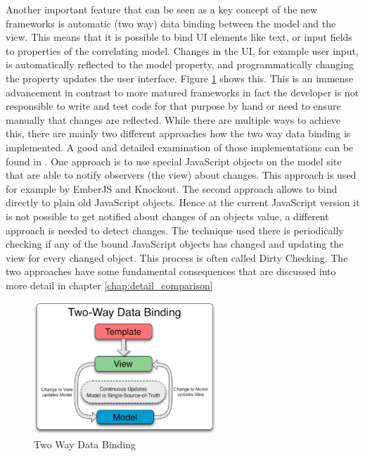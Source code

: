 Another important feature that can be seen as a key concept of the new frameworks is automatic (two way) data binding between the model and the view.
This means that it is possible to bind UI elements like text, or input fields to properties of the correlating model.
Changes in the UI, for example user input, is automatically reflected to the model property, and programmatically changing the property updates the user interface. Figure \ref{fig:data-binding} shows this.
This is an immense advancement in contrast to more matured frameworks in fact the developer is not responsible to write and test code for that purpose by hand or need to ensure manually that changes are reflected.
While there are multiple ways to achieve this, there are mainly two different approaches how the two way data binding is implemented.
A good and detailed examination of those implementations can be found in \autocite[]{binding_comparison}.
One approach is to use special JavaScript objects on the model site that are able to notify observers (the view) about changes.
This approach is used for example by EmberJS and Knockout.
The second approach allows to bind directly to plain old JavaScript objects.
Hence at the current JavaScript version it is not possible to get notified about changes of an objects value, a different approach is needed to detect changes.
The technique used there is periodically checking if any of the bound JavaScript objects has changed and updating the view for every changed object.
This process is often called Dirty Checking.
The two approaches have some fundamental consequences that are discussed into more detail in chapter \ref{chap:detail_comparison}

\begin{figure}
	\centering \includegraphics[width=0.61\textwidth]{./img/web-dev/data-binding.png}
	\caption{Two Way Data Binding \autocite{ng-binding}}
	\label{fig:data-binding}
\end{figure}

